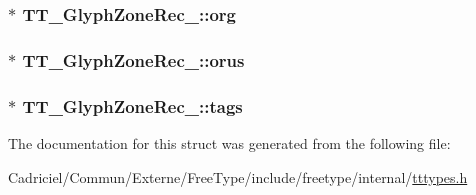 \hypertarget{struct_t_t___glyph_zone_rec___a240879d0a1a6dd487b84f3b3723f9058}{
\subsubsection[{org}]{$\ast$ T\-T\-\_\-\-Glyph\-Zone\-Rec\-\_\-\-::org}}\label{struct_t_t___glyph_zone_rec___a240879d0a1a6dd487b84f3b3723f9058}
\hypertarget{struct_t_t___glyph_zone_rec___a4b4193dbae177435cb6515f9a0537fa0}{
\subsubsection[{orus}]{$\ast$ T\-T\-\_\-\-Glyph\-Zone\-Rec\-\_\-\-::orus}}\label{struct_t_t___glyph_zone_rec___a4b4193dbae177435cb6515f9a0537fa0}
\hypertarget{struct_t_t___glyph_zone_rec___ae816c5c1096e333741d3f3f9d3ae0a8f}{
\subsubsection[{tags}]{$\ast$ T\-T\-\_\-\-Glyph\-Zone\-Rec\-\_\-\-::tags}}\label{struct_t_t___glyph_zone_rec___ae816c5c1096e333741d3f3f9d3ae0a8f}


The documentation for this struct was generated from the following file\-:\begin{DoxyCompactItemize}
\item 
Cadriciel/\-Commun/\-Externe/\-Free\-Type/include/freetype/internal/\hyperlink{tttypes_8h}{tttypes.\-h}\end{DoxyCompactItemize}
